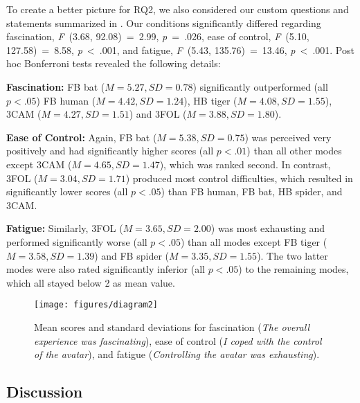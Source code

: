 \documentclass[conference]{IEEEtran}
\begin{document}
To create a better picture for RQ2, we also considered our custom questions and statements summarized in . Our conditions significantly differed regarding fascination, \textit{F}~(3.68, 92.08)~=~2.99, \textit{p}~=~.026, ease of control, \textit{F}~(5.10, 127.58)~=~8.58, \textit{p}~<~.001, and fatigue, \textit{F}~(5.43, 135.76)~=~13.46, \textit{p}~<~.001.  Post hoc Bonferroni tests revealed the following details:



\textbf{Fascination:} FB bat ($M = 5.27, SD = 0.78$) significantly outperformed (all $p < .05$) FB human ($M = 4.42, SD = 1.24$), HB tiger ($M = 4.08, SD = 1.55$), 3CAM ($M = 4.27, SD = 1.51$) and 3FOL ($M = 3.88, SD = 1.80$). 



\textbf{Ease of Control:} Again, FB bat ($M = 5.38, SD = 0.75$) was perceived very positively and had significantly higher scores (all $p < .01$) than all other modes except 3CAM ($M = 4.65, SD = 1.47$), which was ranked second. In contrast, 3FOL ($M = 3.04, SD = 1.71$) produced most control difficulties, which resulted in significantly lower scores (all $p < .05$) than FB human, FB bat, HB spider, and 3CAM. 

\textbf{Fatigue:} Similarly, 3FOL ($M = 3.65, SD = 2.00$) was most exhausting and performed significantly worse (all $p < .05$) than all modes except FB tiger ($M = 3.58, SD = 1.39$) and FB spider ($M = 3.35, SD = 1.55$). The two latter modes were also rated significantly inferior (all $p < .05$) to the remaining modes, which all stayed below 2 as mean value.





\begin{figure*}[t!]
\centering
\texttt{[image: figures/diagram2]}
\caption{Mean scores and standard deviations for fascination (\textit{The overall experience was fascinating}), ease of control (\textit{I coped with the control of the avatar}), and fatigue (\textit{Controlling the avatar was exhausting}).}
\label{fig:diagram2}
\end{figure*}




\subsection{Discussion}
\end{document}
